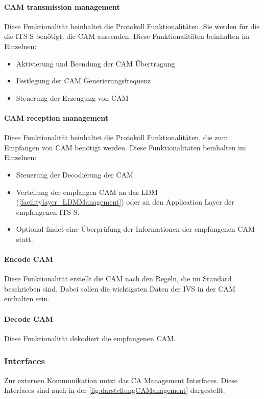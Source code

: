 \paragraph{CAM transmission management}
Diese Funktionalität beinhaltet die Protokoll Funktionalitäten. Sie werden für die die \ac{ITS-S} benötigt, die \ac{CAM} aussenden. Diese Funktionalitäten beinhalten im Einzelnen:
\begin{itemize}
	\item Aktivierung und Beendung der \ac{CAM} Übertragung
	\item Festlegung der \ac{CAM} Generierungsfrequenz 
	\item Steuerung der Erzeugung von \ac{CAM}
\end{itemize}

\paragraph{CAM reception management}
Diese Funktionalität beinhaltet die Protokoll Funktionalitäten, die zum Empfangen von \ac{CAM} benötigt werden. Diese Funktionalitäten beinhalten im Einzelnen:
\begin{itemize}
	\item Steuerung der Decodierung der \ac{CAM}
	\item Verteilung der empfangen \ac{CAM} an das \ac{LDM} (\ref{facilitylayer_LDMManagement}) oder an den Application Layer der empfangenen \ac{ITS-S}.
	\item Optional findet eine Überprüfung der Informationen der empfangenen \ac{CAM} statt.
\end{itemize}

\paragraph{Encode CAM}
Diese Funktionalität erstellt die \ac{CAM} nach den Regeln, die im Standard \cite{en302637-2} beschrieben sind. Dabei sollen die wichtigsten Daten der \ac{IVS} in der \ac{CAM} enthalten sein.

\paragraph{Decode CAM}
Diese Funktionalität dekodiert die empfangenen \ac{CAM}.


\subsubsection{Interfaces \label{facilitylayer_cam_interfaces}}
Zur externen Kommunikation nutzt das \ac{CA} Management Interfaces. Diese Interfaces sind auch in der  \autoref{fig:darstellungCAManagement} dargestellt. 

